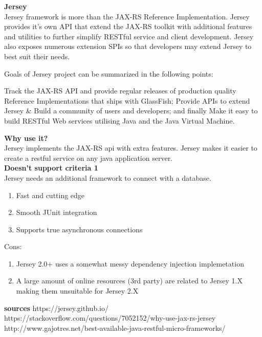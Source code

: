 \textbf{Jersey}\\
Jersey framework is more than the JAX-RS Reference Implementation. Jersey provides it’s own API that extend the JAX-RS toolkit with additional features and utilities to further simplify RESTful service and client development. Jersey also exposes numerous extension SPIs so that developers may extend Jersey to best suit their needs.

Goals of Jersey project can be summarized in the following points:

Track the JAX-RS API and provide regular releases of production quality Reference Implementations that ships with GlassFish;
Provide APIs to extend Jersey & Build a community of users and developers; and finally
Make it easy to build RESTful Web services utilising Java and the Java Virtual Machine.


\textbf{Why use it?} \\
Jersey implements the JAX-RS api with extra features. Jersey makes it easier to create a restful service on any java application server. \\

\textbf{Doesn't support criteria 1}\\
Jersey needs an additional framework  to connect with a database.

\begin{enumerate}
	\item Fast and cutting edge
	\item Smooth JUnit integration
	\item Supports true asynchronous connections
\end{enumerate}
Cons:
\begin{enumerate}
	\item Jersey 2.0+ uses a somewhat messy dependency injection implemetation
	\item A large amount of online resources (3rd party) are related to Jersey 1.X making them unsuitable for Jersey 2.X
\end{enumerate}

\textbf{sources}
https://jersey.github.io/
https://stackoverflow.com/questions/7052152/why-use-jax-rs-jersey
http://www.gajotres.net/best-available-java-restful-micro-frameworks/